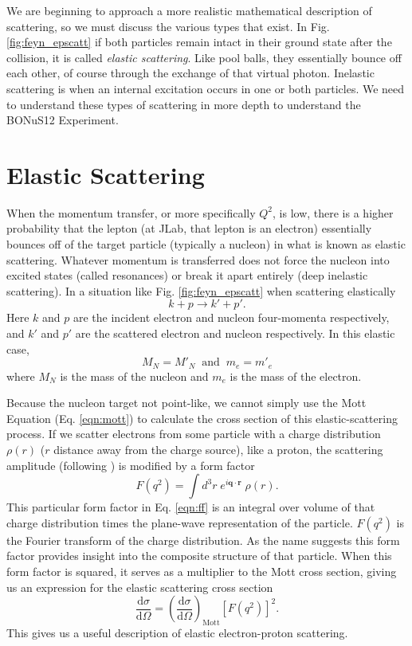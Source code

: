 We are beginning to approach a more realistic mathematical description of scattering, so we must discuss the various types that exist. In Fig. \ref{fig:feyn_epscatt} if both particles remain intact in their ground state after the collision, it is called \textit{elastic scattering}. Like pool balls, they essentially bounce off each other, of course through the exchange of that virtual photon. Inelastic  scattering is when an internal excitation occurs in one or both particles. We need to understand these types of scattering in more depth to understand the BONuS12 Experiment.

\section{Elastic Scattering}
When the momentum transfer, or more specifically $Q^2$, is low, there is a higher probability that the lepton (at JLab, that lepton is an electron) essentially bounces off of the target particle (typically a nucleon) in what is known as elastic scattering. Whatever momentum is transferred does not force the nucleon into excited states (called resonances) or break it apart entirely (deep inelastic scattering). In a situation like Fig. \ref{fig:feyn_epscatt} when scattering elastically
\begin{equation}
k+p \longrightarrow k' + p'.
\end{equation}
Here $k$ and $p$ are the incident electron and nucleon four-momenta respectively, and $k'$ and $p'$ are the scattered electron and nucleon respectively. In this elastic case,
\begin{equation}
M_N = M'_N \; \; \mathrm{and} \; \; m_e = m'_e
\end{equation}
where $M_N$ is the mass of the nucleon and $m_e$ is the mass of the electron. 

Because the nucleon target not point-like, we cannot simply use the Mott Equation (Eq. \ref{eqn:mott}) to calculate the cross section of this elastic-scattering process. If we scatter electrons from some particle with a charge distribution $\rho(r)$ ($r$ distance away from the charge source), like a proton, the scattering amplitude (following \cite{book:halzen}) is modified by a form factor
\begin{equation}
\label{eqn:ff}
F(q^2) = \int d^3r \; e^{i\mathbf{q} \cdot \mathbf{r}} \; \rho(r).
\end{equation}
This particular form factor in Eq. \ref{eqn:ff} is an integral over volume of that charge distribution times the plane-wave representation of the particle. $F(q^2)$ is the Fourier transform of the charge distribution. As the name suggests this form factor provides insight into the composite structure of that particle. When this form factor is squared, it serves as a multiplier to the Mott cross section, giving us an expression for the elastic scattering cross section
\begin{equation}
\frac{\mathrm{d}\sigma}{\mathrm{d}\Omega} = \left( \frac{\mathrm{d}\sigma}{\mathrm{d}\Omega} \right)_{\mathrm{Mott}} [F(q^2)]^2.
\end{equation}
This gives us a useful description of elastic electron-proton scattering.

